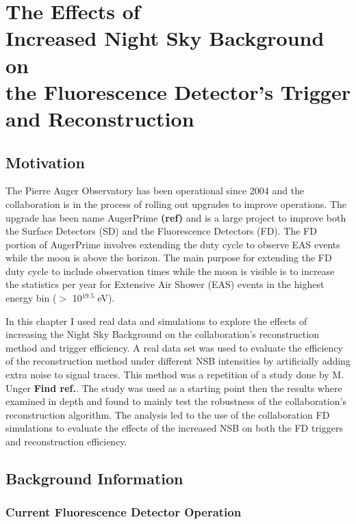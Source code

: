 \chapter[The Effects of Increased NSB on the FD Trigger and Reconstruction]{\centering The Effects of \\ Increased Night Sky Background on \\ the Fluorescence Detector's Trigger and Reconstruction \\ }\label{Ch:SelectEff}

\section{Motivation}

The Pierre Auger Observatory has been operational since 2004 and the collaboration is in the process of rolling out upgrades to improve operations. The upgrade has been name AugerPrime \textbf{(ref)} and is a large project to improve both the Surface Detectors (SD) and the Fluorescence Detectors (FD). The FD portion of AugerPrime involves extending the duty cycle to observe EAS events while the moon is above the horizon. The main purpose for extending the FD duty cycle to include observation times while the moon is visible is to increase the statistics per year for Extensive Air Shower (EAS) events in the highest energy bin ($>$ 10$^{19.5}$ eV). 

In this chapter I used real data and simulations to explore the effects of increasing the Night Sky Background on the collaboration's reconstruction method and trigger efficiency. A real data set was used to evaluate the efficiency of the reconstruction method under different NSB intensities by artificially adding extra noise to signal traces. This method was a repetition of a study done by M. Unger \textbf{Find ref.}. The study was used as a starting point then the results where examined in depth and found to mainly test the robustness of the collaboration's reconstruction algorithm. The analysis led to the use of the collaboration FD simulations to evaluate the effects of the increased NSB on both the FD triggers and reconstruction efficiency.

\section{Background Information}

\subsection{Current Fluorescence Detector Operation}

